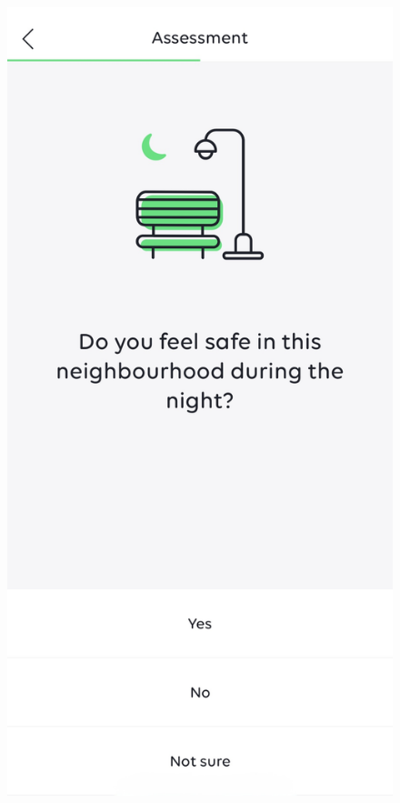 \begin{figure}[h]
    \centering
    \begin{minipage}[t]{0.38\textwidth}
        \centering
        \includegraphics[width=\textwidth]{Arbeit/Bilder/urban_mind01.jpeg}

\end{minipage}
\end{figure}
